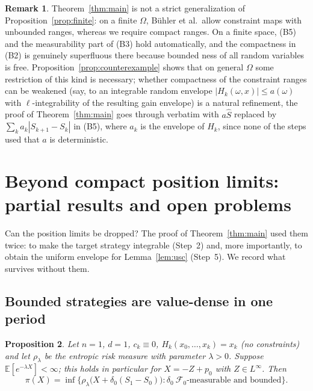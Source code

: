 \documentclass[11pt,a4paper]{report}
\numberwithin{equation}{chapter}
\theoremstyle{plain}
\newtheorem{proposition}{Proposition}[chapter]
\theoremstyle{definition}
\newtheorem{remark}[proposition]{Remark}
\newcommand{\E}{\mathbb{E}}
\newcommand{\F}{\mathcal{F}}
\begin{document}
\begin{remark}\label{rem:comparison-finite}
    Theorem~\ref{thm:main} is not a strict generalization of Proposition~\ref{prop:finite}: on a finite $\Omega$, B\"uhler et al.\ allow constraint maps with unbounded ranges, whereas we require compact ranges. On a finite space, (B5) and the measurability part of (B3) hold automatically, and the compactness in (B2) is genuinely superfluous there because bounded ness of all random variables is free. Proposition~\ref{prop:counterexample} shows that on general $\Omega$ some restriction of this kind is necessary; whether compactness of the constraint ranges can be weakened (say, to an integrable random envelope $|H_k(\omega,x)|\le a(\omega)$ with $\ell$-integrability of the resulting gain envelope) is a natural refinement, the proof of Theorem~\ref{thm:main} goes through verbatim with $a\widehat S$ replaced by $\sum_k a_k|S_{k+1}-S_k|$ in (B5), where $a_k$ is the envelope of $H_k$, since none of the steps used that $a$ is deterministic.
\end{remark}

\section{Beyond compact position limits: partial results and open problems}\label{sec:beyond}

Can the position limits be dropped? The proof of Theorem~\ref{thm:main} used them twice: to make the target strategy integrable (Step~2) and, more importantly, to obtain the uniform envelope for Lemma~\ref{lem:usc} (Step~5). We record what survives without them.

\subsection*{Bounded strategies are value-dense in one period}

\begin{proposition}\label{prop:oneperiod}
    Let $n=1$, $d=1$, $c_k\equiv0$, $H_k(x_0,\dots,x_k)=x_k$ (no constraints) and let $\rho_\lambda$ be the entropic risk measure with parameter $\lambda>0$. Suppose $\E[e^{-\lambda X}]<\infty$; this holds in particular for $X=-Z+p_0$ with $Z\in L^\infty$. Then
    \[
        \pi(X)=\inf\bigl\{\rho_\lambda\bigl(X+\delta_0(S_1-S_0)\bigr):\delta_0\ \F_0\text{-measurable and bounded}\bigr\}.
    \]
\end{proposition}
\end{document}
